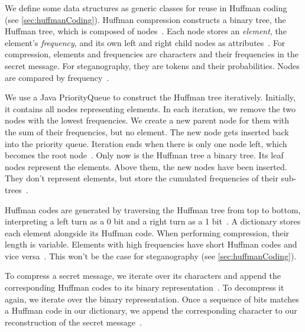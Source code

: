 We define some data structures as generic classes for reuse in Huffman coding (see \cref{sec:huffmanCoding}). Huffman compression constructs a binary tree, the Huffman tree, which is composed of nodes~\cite{huffmanMethodConstructionMinimumRedundancy1952}. Each node stores an \textit{element}, the element's \textit{frequency}, and its own left and right child nodes as attributes~\cite{huffmanMethodConstructionMinimumRedundancy1952}. For compression, elements and frequencies are characters and their frequencies in the secret message. For steganography, they are tokens and their probabilities. Nodes are compared by frequency~\cite{huffmanMethodConstructionMinimumRedundancy1952}.

We use a Java PriorityQueue to construct the Huffman tree iteratively. Initially, it contains all nodes representing elements. In each iteration, we remove the two nodes with the lowest frequencies. We create a new parent node for them with the sum of their frequencies, but no element. The new node gets inserted back into the priority queue. Iteration ends when there is only one node left, which becomes the root node~\cite{huffmanMethodConstructionMinimumRedundancy1952}. Only now is the Huffman tree a binary tree. Its leaf nodes represent the elements. Above them, the new nodes have been inserted. They don't represent elements, but store the cumulated frequencies of their sub-trees~\cite{huffmanMethodConstructionMinimumRedundancy1952}.

Huffman codes are generated by traversing the Huffman tree from top to bottom, interpreting a left turn as a 0 bit and a right turn as a 1 bit~\cite{huffmanMethodConstructionMinimumRedundancy1952}. A dictionary stores each element alongside its Huffman code. When performing compression, their length is variable. Elements with high frequencies have short Huffman codes and vice versa~\cite{huffmanMethodConstructionMinimumRedundancy1952}. This won't be the case for steganography (see \cref{sec:huffmanCoding}).

To compress a secret message, we iterate over its characters and append the corresponding Huffman codes to its binary representation~\cite{huffmanMethodConstructionMinimumRedundancy1952}. To decompress it again, we iterate over the binary representation. Once a sequence of bits matches a Huffman code in our dictionary, we append the corresponding character to our reconstruction of the secret message~\cite{huffmanMethodConstructionMinimumRedundancy1952}.

